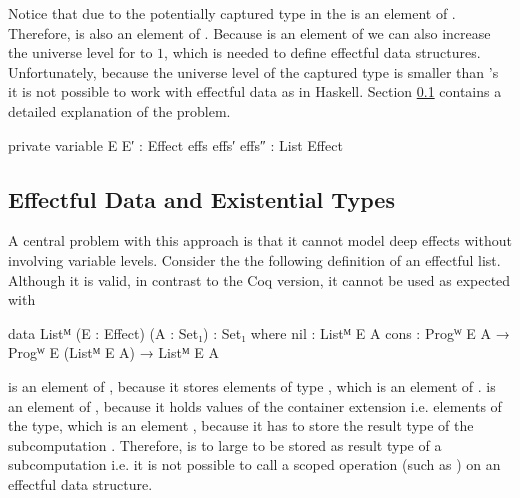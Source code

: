 Notice that due to the potentially captured type in the  is an
element of .
Therefore,  is also an element of .
Because  is an element of  we can also
increase the universe level for  to $1$, which is needed to
define effectful data structures.
Unfortunately, because the universe level of the captured type is smaller than
's it is not possible to work with effectful data as in
Haskell.
Section \ref{higher-order:eff-data-ext-types} contains a detailed explanation of
the problem.

\begin{code}[hide]
private
  variable
    E E′ : Effect
    effs effs′ effs″ : List Effect
\end{code}

\subsection{Effectful Data and Existential Types}
\label{higher-order:eff-data-ext-types}

A central problem with this approach is that it cannot model deep effects
without involving variable levels.
Consider the the following definition of an effectful list.
Although it is valid, in contrast to the Coq version, it cannot be used as
expected with 

\begin{code}
data Listᴹ (E : Effect) (A : Set₁) : Set₁ where
  nil   : Listᴹ E A
  cons  : Progᵂ E A → Progᵂ E (Listᴹ E A) → Listᴹ E A
\end{code}
\AgdaSpace{}\AgdaSpace{} is
an element of , because it stores elements of type
\AgdaSpace{}\AgdaSpace{},
which is an element of .
\AgdaSpace{}\AgdaSpace{} is
an element of , because it holds values of the container
extension i.e. elements of the  type, which is an element
, because it has to store the result type of the
subcomputation .
Therefore,
\AgdaSpace{}\AgdaSpace{} is
to large to be stored as result type of a subcomputation i.e. it is not possible
to call a scoped operation (such as ) on an effectful data
structure.

